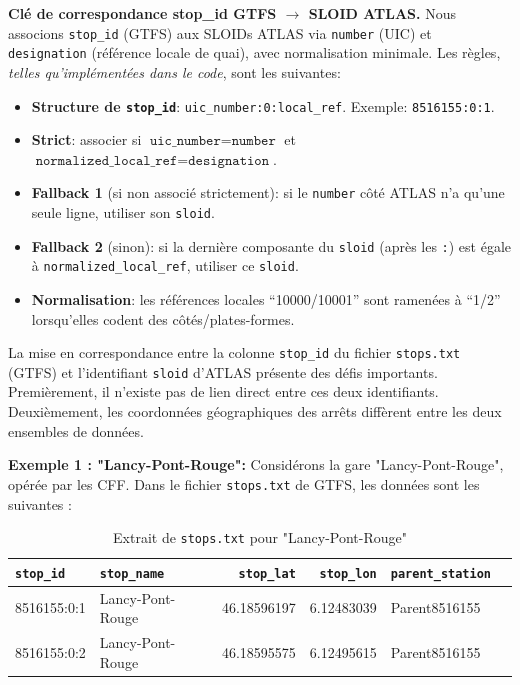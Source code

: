\medskip
\noindent\textbf{Clé de correspondance stop\_id GTFS \(\to\) SLOID ATLAS.} Nous associons \texttt{stop\_id} (GTFS) aux SLOIDs ATLAS via \texttt{number} (UIC) et \texttt{designation} (référence locale de quai), avec normalisation minimale. Les règles, \emph{telles qu'implémentées dans le code}, sont les suivantes:
\begin{itemize}
  \item \textbf{Structure de \texttt{stop\_id}}: \texttt{uic\_number:0:local\_ref}. Exemple: \texttt{8516155:0:1}.
  \item \textbf{Strict}: associer si \(\texttt{uic\_number} = \texttt{number}\) et \(\texttt{normalized\_local\_ref} = \texttt{designation}\).
  \item \textbf{Fallback 1} (si non associé strictement): si le \texttt{number} côté ATLAS n’a qu’une seule ligne, utiliser son \texttt{sloid}.
  \item \textbf{Fallback 2} (sinon): si la dernière composante du \texttt{sloid} (après les \texttt{:}) est égale à \texttt{normalized\_local\_ref}, utiliser ce \texttt{sloid}.
  \item \textbf{Normalisation}: les références locales \enquote{10000/10001} sont ramenées à \enquote{1/2} lorsqu’elles codent des côtés/plates-formes.
\end{itemize}

La mise en correspondance entre la colonne \texttt{stop\_id} du fichier \texttt{stops.txt} (GTFS) et l’identifiant \texttt{sloid} d’ATLAS présente des défis importants. Premièrement, il n’existe pas de lien direct entre ces deux identifiants. Deuxièmement, les coordonnées géographiques des arrêts diffèrent entre les deux ensembles de données.

\textbf{Exemple 1 : "Lancy-Pont-Rouge":}
\newline
Considérons la gare "Lancy-Pont-Rouge", opérée par les CFF. Dans le fichier \texttt{stops.txt} de GTFS, les données sont les suivantes :

\begin{table}[H]
\caption{Extrait de \texttt{stops.txt} pour "Lancy-Pont-Rouge"}
\label{tab:stops_lancy_2}
\centering
\begin{tabular}{l l r r l l}
\toprule
\texttt{stop\_id} & \texttt{stop\_name} & \texttt{stop\_lat} & \texttt{stop\_lon} & \texttt{parent\_station} \\
\midrule
8516155:0:1 & Lancy-Pont-Rouge & 46.18596197 & 6.12483039 & Parent8516155 \\
8516155:0:2 & Lancy-Pont-Rouge & 46.18595575 & 6.12495615 & Parent8516155 \\
\bottomrule
\end{tabular}
\end{table}

